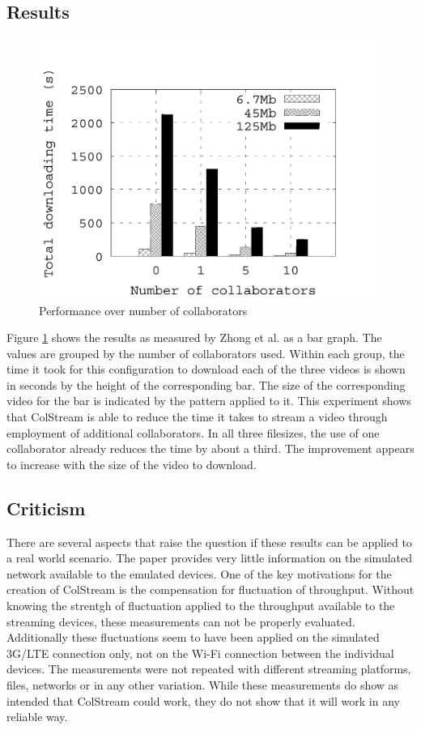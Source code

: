 \subsection{Results}
\begin{figure}[hbt]
\centering
\caption{Performance over number of collaborators \cite{ColStream}}
\label{performanceResults}
\includegraphics[scale=.5]{figures/Results.png}
\end{figure}
Figure \ref{performanceResults} shows the results as measured by Zhong et al. as a bar graph. The values are grouped by the number of collaborators used. Within each group, the time it took for this configuration to download each of the three videos is shown in seconds by the height of the corresponding bar. The size of the corresponding video for the bar is indicated by the pattern applied to it. This experiment shows that ColStream is able to reduce the time it takes to stream a video through employment of additional collaborators. In all three filesizes, the use of one collaborator already reduces the time by about a third. The improvement appears to increase with the size of the video to download.

\subsection{Criticism}
There are several aspects that raise the question if these results can be applied to a real world scenario. The paper provides very little information on the simulated network available to the emulated devices. One of the key motivations for the creation of ColStream is the compensation for fluctuation of throughput. Without knowing the strentgh of fluctuation applied to the throughput available to the streaming devices, these measurements can not be properly evaluated. Additionally these fluctuations seem to have been applied on the simulated 3G/LTE connection only, not on the Wi-Fi connection between the individual devices. The measurements were not repeated with different streaming platforms, files, networks or in any other variation. While these measurements do show as intended that ColStream could work, they do not show that it will work in any reliable way.


